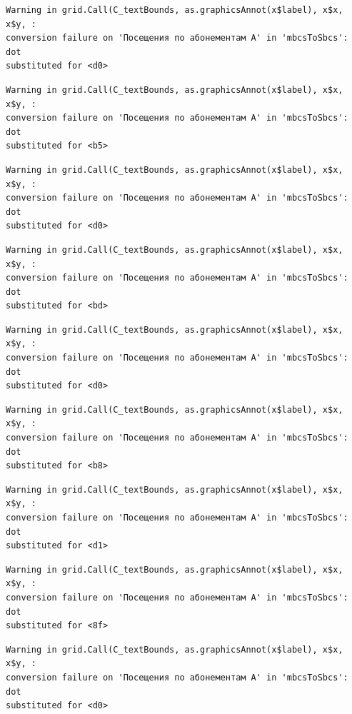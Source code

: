 \documentclass[
  letterpaper,
  DIV=11,
  numbers=noendperiod]{scrartcl}
\begin{document}
\begin{verbatim}
Warning in grid.Call(C_textBounds, as.graphicsAnnot(x$label), x$x, x$y, :
conversion failure on 'Посещения по абонементам А' in 'mbcsToSbcs': dot
substituted for <d0>
\end{verbatim}

\begin{verbatim}
Warning in grid.Call(C_textBounds, as.graphicsAnnot(x$label), x$x, x$y, :
conversion failure on 'Посещения по абонементам А' in 'mbcsToSbcs': dot
substituted for <b5>
\end{verbatim}

\begin{verbatim}
Warning in grid.Call(C_textBounds, as.graphicsAnnot(x$label), x$x, x$y, :
conversion failure on 'Посещения по абонементам А' in 'mbcsToSbcs': dot
substituted for <d0>
\end{verbatim}

\begin{verbatim}
Warning in grid.Call(C_textBounds, as.graphicsAnnot(x$label), x$x, x$y, :
conversion failure on 'Посещения по абонементам А' in 'mbcsToSbcs': dot
substituted for <bd>
\end{verbatim}

\begin{verbatim}
Warning in grid.Call(C_textBounds, as.graphicsAnnot(x$label), x$x, x$y, :
conversion failure on 'Посещения по абонементам А' in 'mbcsToSbcs': dot
substituted for <d0>
\end{verbatim}

\begin{verbatim}
Warning in grid.Call(C_textBounds, as.graphicsAnnot(x$label), x$x, x$y, :
conversion failure on 'Посещения по абонементам А' in 'mbcsToSbcs': dot
substituted for <b8>
\end{verbatim}

\begin{verbatim}
Warning in grid.Call(C_textBounds, as.graphicsAnnot(x$label), x$x, x$y, :
conversion failure on 'Посещения по абонементам А' in 'mbcsToSbcs': dot
substituted for <d1>
\end{verbatim}

\begin{verbatim}
Warning in grid.Call(C_textBounds, as.graphicsAnnot(x$label), x$x, x$y, :
conversion failure on 'Посещения по абонементам А' in 'mbcsToSbcs': dot
substituted for <8f>
\end{verbatim}

\begin{verbatim}
Warning in grid.Call(C_textBounds, as.graphicsAnnot(x$label), x$x, x$y, :
conversion failure on 'Посещения по абонементам А' in 'mbcsToSbcs': dot
substituted for <d0>
\end{verbatim}
\end{document}
